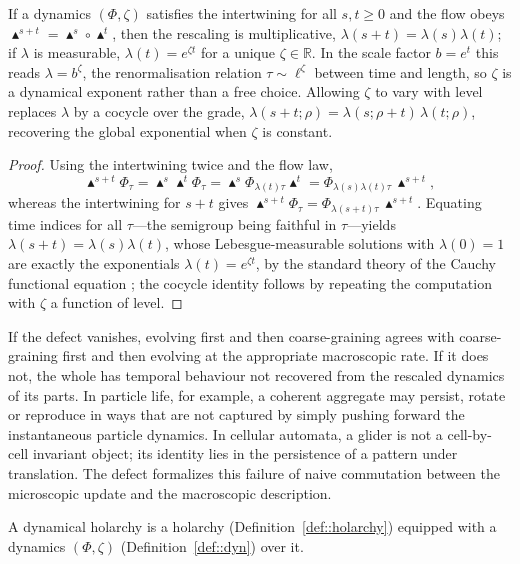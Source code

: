 \documentclass[runningheads]{llncs}
\newcommand{\R}{\mathbb{R}}
\begin{document}
\begin{proposition}\label{prop::resc}
If a dynamics $(\Phi,\zeta)$ satisfies the intertwining for all $s,t\geq0$ and the flow obeys $\blacktriangle^{s+t}=\blacktriangle^s\circ\blacktriangle^t$, then the rescaling is multiplicative, $\lambda(s+t)=\lambda(s)\lambda(t)$; if $\lambda$ is measurable, $\lambda(t)=e^{\zeta t}$ for a unique $\zeta\in\R$. In the scale factor $b=e^{t}$ this reads $\lambda=b^{\zeta}$, the renormalisation relation $\tau\sim\ell^{\zeta}$ between time and length, so $\zeta$ is a dynamical exponent rather than a free choice. Allowing $\zeta$ to vary with level replaces $\lambda$ by a cocycle over the grade, $\lambda(s+t;\rho)=\lambda(s;\rho+t)\,\lambda(t;\rho)$, recovering the global exponential when $\zeta$ is constant.
\end{proposition}
\begin{proof}
Using the intertwining twice and the flow law,
\[
\blacktriangle^{s+t}\Phi_\tau=\blacktriangle^s\blacktriangle^t\Phi_\tau=\blacktriangle^s\Phi_{\lambda(t)\tau}\blacktriangle^t=\Phi_{\lambda(s)\lambda(t)\tau}\,\blacktriangle^{s+t},
\]
whereas the intertwining for $s+t$ gives $\blacktriangle^{s+t}\Phi_\tau=\Phi_{\lambda(s+t)\tau}\,\blacktriangle^{s+t}$. Equating time indices for all $\tau$---the semigroup being faithful in $\tau$---yields $\lambda(s+t)=\lambda(s)\lambda(t)$, whose Lebesgue-measurable solutions with $\lambda(0)=1$ are exactly the exponentials $\lambda(t)=e^{\zeta t}$, by the standard theory of the Cauchy functional equation \cite{Aczel1966}; the cocycle identity follows by repeating the computation with $\zeta$ a function of level.
\end{proof}

If the defect vanishes, evolving first and then coarse-graining agrees with coarse-graining first and then evolving at the appropriate macroscopic rate. If it does not, the whole has temporal behaviour not recovered from the rescaled dynamics of its parts. In particle life, for example, a coherent aggregate may persist, rotate or reproduce in ways that are not captured by simply pushing forward the instantaneous particle dynamics. In cellular automata, a glider is not a cell-by-cell invariant object; its identity lies in the persistence of a pattern under translation. The defect formalizes this failure of naive commutation between the microscopic update and the macroscopic description.

\begin{definition}\label{def::dynholarchy}
A dynamical holarchy is a holarchy (Definition~\ref{def::holarchy}) equipped with a dynamics $(\Phi,\zeta)$ (Definition~\ref{def::dyn}) over it.
\end{definition}
\end{document}
